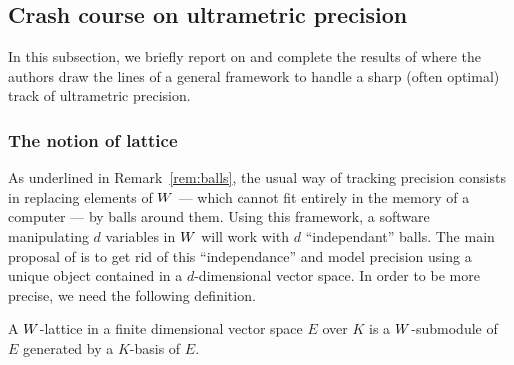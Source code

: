 \documentclass{article}
\begin{document}
\subsection{Crash course on ultrametric precision}
\label{subsec:crashcourse}

In this subsection, we briefly report on and complete the results of 
\cite{padicprec} where the authors draw the lines of a general framework 
to handle a sharp (often optimal) track of ultrametric precision.

\subsubsection{The notion of lattice}

As underlined in Remark~\ref{rem:balls}, the usual way of tracking 
precision consists in replacing elements of $W$ --- which cannot fit 
entirely in the memory of a computer --- by balls around them. Using 
this framework, a software manipulating $d$ variables in $W$ will work 
with $d$ ``independant'' balls. The main proposal of \cite{padicprec} is 
to get rid of this ``independance'' and model precision using a unique
object contained in a $d$-dimensional vector space. In order to be more
precise, we need the following definition.

\begin{deftn}
A $W$-lattice in a finite dimensional vector space $E$ over $K$ is
a $W$-submodule of $E$ generated by a $K$-basis of $E$.
\end{deftn}
\end{document}
